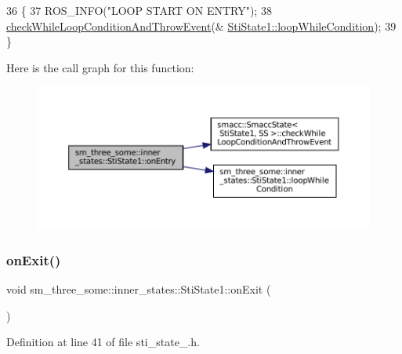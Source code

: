 \begin{DoxyCode}
36   \{
37     ROS\_INFO(\textcolor{stringliteral}{"LOOP START ON ENTRY"});
38     \hyperlink{classsmacc_1_1SmaccState_a80082718f226bebedb589f0c4696001d}{checkWhileLoopConditionAndThrowEvent}(&
      \hyperlink{structsm__three__some_1_1inner__states_1_1StiState1_aa57c154b9243b49328c11ba48c5d9779}{StiState1::loopWhileCondition});
39   \}
\end{DoxyCode}
Here is the call graph for this function\+:
\nopagebreak
\begin{figure}[H]
\begin{center}
\leavevmode
\includegraphics[width=350pt]{structsm__three__some_1_1inner__states_1_1StiState1_a678a34ba0258c496f873012299e65b98_cgraph}
\end{center}
\end{figure}
\mbox{\label{structsm__three__some_1_1inner__states_1_1StiState1_a28b7cf146965879086d459d3cca44ace}} 
\subsubsection{\texorpdfstring{on\+Exit()}{onExit()}}
{\footnotesize\ttfamily void sm\+\_\+three\+\_\+some\+::inner\+\_\+states\+::\+Sti\+State1\+::on\+Exit (\begin{DoxyParamCaption}{ }\end{DoxyParamCaption})\hspace{0.3cm}{\ttfamily [inline]}}



Definition at line 41 of file sti\+\_\+state\+\_.\+h.


